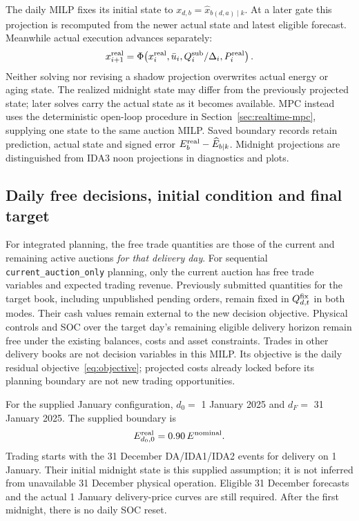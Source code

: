\documentclass[11pt,a4paper]{article}
\begin{document}
The daily MILP fixes its initial state to
$x_{d,b}=\widehat x_{b(d,a)\mid k}$. At a later gate this projection is recomputed
from the newer actual state and latest eligible forecast. Meanwhile actual
execution advances separately:
\begin{equation}
 x^{\rm real}_{i+1}=\Phi\!\left(x^{\rm real}_i,\bar u_i,
       Q_i^{\rm sub}/\Delta_i,P_i^{\rm real}\right).
\end{equation}
Neither solving nor revising a shadow projection overwrites actual energy or
aging state. The realized midnight state may differ from the previously
projected state; later solves carry the actual state as it becomes available.
MPC instead uses the deterministic open-loop procedure in
Section~\ref{sec:realtime-mpc}, supplying one state to the same auction MILP.
Saved boundary records retain prediction, actual state and signed error
$E_b^{\rm real}-\widehat E_{b\mid k}$. Midnight projections are distinguished
from IDA3 noon projections in diagnostics and plots.

\subsection{Daily free decisions, initial condition and final target}
For integrated planning, the free trade quantities are those of the current
and remaining active auctions \emph{for that delivery day}. For sequential
\texttt{current\_auction\_only} planning, only the current auction has free
trade variables and expected trading revenue. Previously submitted quantities
for the target book, including unpublished pending orders, remain fixed in
$Q^{\rm fix}_{d,t}$ in both modes. Their cash values remain external to the
new decision objective. Physical controls and SOC over the target day's
remaining eligible delivery horizon remain free under the existing balances,
costs and asset constraints. Trades in other delivery books are not decision
variables in this MILP. Its objective is the daily residual
objective~\eqref{eq:objective}; projected costs already locked before its
planning boundary are not new trading opportunities.

For the supplied January configuration, $d_0=$ 1 January 2025 and $d_F=$
31 January 2025. The supplied boundary is
\begin{equation}
 E^{\rm real}_{d_0,0}=0.90\,E^{\rm nominal}.
\end{equation}
Trading starts with the 31 December DA/IDA1/IDA2 events for delivery on
1 January. Their initial midnight state is this supplied assumption; it is
not inferred from unavailable 31 December physical operation. Eligible
31 December forecasts and the actual 1 January delivery-price curves are
still required. After the first midnight, there is no daily SOC reset.
\end{document}
